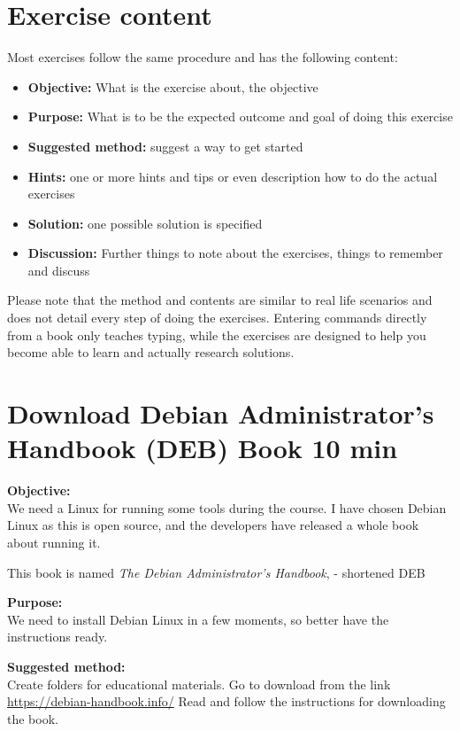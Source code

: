 \documentclass[a4paper,11pt,notitlepage]{report}
\begin{document}
\chapter*{\color{titlecolor}Exercise content}

Most exercises follow the same procedure and has the following content:
\begin{itemize}
\item {\bf Objective:} What is the exercise about, the objective
\item {\bf Purpose:} What is to be the expected outcome and goal of doing this exercise
\item {\bf Suggested method:} suggest a way to get started
\item {\bf Hints:} one or more hints and tips or even description how to
do the actual exercises
\item {\bf Solution:} one possible solution is specified
\item {\bf Discussion:} Further things to note about the exercises, things to remember and discuss
\end{itemize}

Please note that the method and contents are similar to real life scenarios and does not detail every step of doing the exercises. Entering commands directly from a book only teaches typing, while the exercises are designed to help you become able to learn and actually research solutions.


\chapter{Download Debian Administrator’s Handbook (DEB) Book 10 min}
\label{ex:sw-downloadDEB}



{\bf Objective:}\\
We need a Linux for running some tools during the course. I have chosen Debian Linux as this is open source, and the developers have released a whole book about running it.

This book is named
\emph{The Debian Administrator’s Handbook},  - shortened DEB

{\bf Purpose:}\\
We need to install Debian Linux in a few moments, so better have the instructions ready.

{\bf Suggested method:}\\
Create folders for educational materials. Go to download from the link \url{https://debian-handbook.info/}
Read and follow the instructions for downloading the book.
\end{document}
